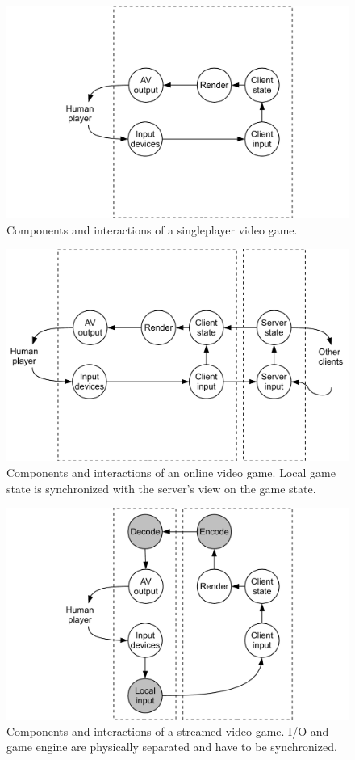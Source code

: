 \begin{figure}[!t]
  \centering
  \includegraphics[width=0.8\columnwidth]{../models/component_interaction-local.pdf}
  \caption{Components and interactions of a singleplayer video game.}
  \label{fig:component-model-local}
\end{figure}

\begin{figure}[!t]
  \centering
  \includegraphics[width=0.8\columnwidth]{../models/component_interaction-online.pdf}
  \caption{Components and interactions of an online video game. Local game state is synchronized with the server's view on the game state.}
  \label{fig:component-model-online}
\end{figure}


\begin{figure}[!t]
  \centering
  \includegraphics[width=0.8\columnwidth]{../models/component_interaction-cloud.pdf}
  \caption{Components and interactions of a streamed video game. I/O and game engine are physically separated and have to be synchronized.}
  \label{fig:component-model-cloud}
\end{figure}


